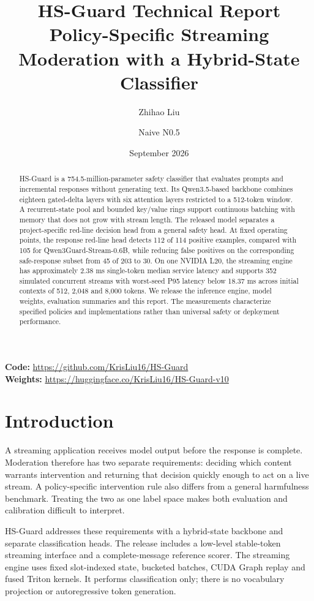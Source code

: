 \documentclass[11pt]{article}
\title{\textbf{HS-Guard Technical Report}\\[5pt]\large Policy-Specific Streaming Moderation with a Hybrid-State Classifier}
\author{Zhihao Liu \and Naive N0.5}
\date{September 2026}
\begin{document}
\maketitle
\begin{abstract}
HS-Guard is a 754.5-million-parameter safety classifier that evaluates prompts and incremental responses without generating text. Its Qwen3.5-based backbone combines eighteen gated-delta layers with six attention layers restricted to a 512-token window. A recurrent-state pool and bounded key/value rings support continuous batching with memory that does not grow with stream length. The released model separates a project-specific red-line decision head from a general safety head. At fixed operating points, the response red-line head detects 112 of 114 positive examples, compared with 105 for Qwen3Guard-Stream-0.6B, while reducing false positives on the corresponding safe-response subset from 45 of 203 to 30. On one NVIDIA L20, the streaming engine has approximately 2.38 ms single-token median service latency and supports 352 simulated concurrent streams with worst-seed P95 latency below 18.37 ms across initial contexts of 512, 2,048 and 8,000 tokens. We release the inference engine, model weights, evaluation summaries and this report. The measurements characterize specified policies and implementations rather than universal safety or deployment performance.
\end{abstract}
\noindent\textbf{Code:} \url{https://github.com/KrisLiu16/HS-Guard}\\
\textbf{Weights:} \url{https://huggingface.co/KrisLiu16/HS-Guard-v10}

\section{Introduction}
A streaming application receives model output before the response is complete. Moderation therefore has two separate requirements: deciding which content warrants intervention and returning that decision quickly enough to act on a live stream. A policy-specific intervention rule also differs from a general harmfulness benchmark. Treating the two as one label space makes both evaluation and calibration difficult to interpret.

HS-Guard addresses these requirements with a hybrid-state backbone and separate classification heads. The release includes a low-level stable-token streaming interface and a complete-message reference scorer. The streaming engine uses fixed slot-indexed state, bucketed batches, CUDA Graph replay and fused Triton kernels. It performs classification only; there is no vocabulary projection or autoregressive token generation.
\end{document}

